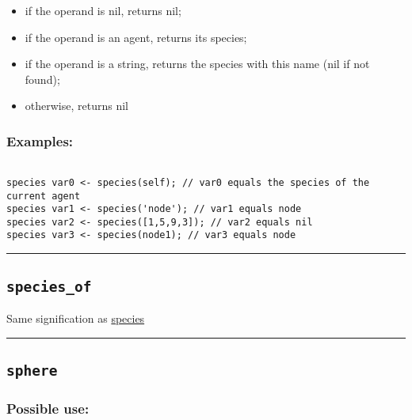 \documentclass[]{book}
\providecommand{\tightlist}{%
  \setlength{\itemsep}{0pt}\setlength{\parskip}{0pt}}
\theoremstyle{definition}
\theoremstyle{definition}
\theoremstyle{definition}
\theoremstyle{remark}
\begin{document}
\begin{itemize}
\tightlist
\item
  if the operand is nil, returns nil;\\
\item
  if the operand is an agent, returns its species;\\
\item
  if the operand is a string, returns the species with this name (nil if
  not found);\\
\item
  otherwise, returns nil
\end{itemize}

\subsubsection{Examples:}\label{examples-341}

\begin{verbatim}
 
species var0 <- species(self); // var0 equals the species of the current agent 
species var1 <- species('node'); // var1 equals node 
species var2 <- species([1,5,9,3]); // var2 equals nil 
species var3 <- species(node1); // var3 equals node
\end{verbatim}

\begin{center}\rule{0.5\linewidth}{\linethickness}\end{center}

\subsection{\texorpdfstring{\texttt{species\_of}}{species\_of}}\label{species_of}

Same signification as \href{OperatorsSZ\#species}{species}

\begin{center}\rule{0.5\linewidth}{\linethickness}\end{center}

\subsection{\texorpdfstring{\texttt{sphere}}{sphere}}\label{sphere}

\subsubsection{Possible use:}\label{possible-use-490}
\end{document}

